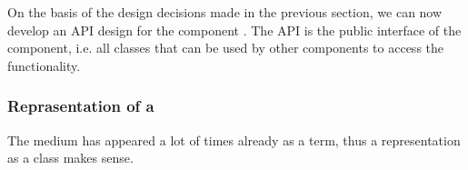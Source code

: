 On the basis of the design decisions made in the previous section, we can now develop an API design for the component \COMPmedia{}. The API is the public interface of the component, i.e. all classes that can be used by other components to access the \COMPmedia{} functionality.


\subsubsection{Reprasentation of a  \TERMmedium{}}
\label{sec:RepraesentationEinesTERMmedium}

The medium has appeared a lot of times already as a term, thus a representation as a class makes sense.

